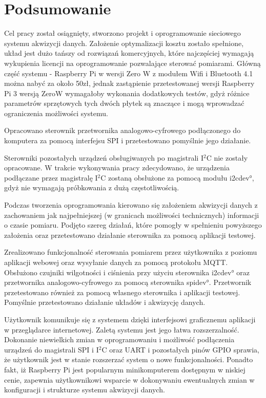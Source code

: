 \chapter{Podsumowanie}
\label{ch:podsumowanie}


Cel pracy został osiągnięty, stworzono projekt i oprogramowanie sieciowego systemu akwizycji danych. Założenie optymalizacji kosztu zostało spełnione, układ jest dużo tańszy od rozwiązań komercyjnych, które najczęściej wymagają wykupienia licencji na oprogramowanie pozwalające sterować pomiarami. Główną część systemu - Raspberry Pi w wersji Zero W z modułem Wifi i Bluetooth 4.1 można nabyć za około 50zł, jednak zastąpienie przetestowanej wersji Raspberry Pi 3 wersją ZeroW wymagałoby wykonania dodatkowych testów, gdyż różnice parametrów sprzętowych tych dwóch płytek są znaczące i mogą wprowadzać ograniczenia możliwości systemu.

Opracowano sterownik przetwornika analogowo-cyfrowego podłączonego do komputera za pomocą interfejsu SPI i przetestowano pomyślnie jego działanie.

Sterowniki pozostałych urządzeń obsługiwanych po magistrali I$^2$C nie zostały opracowane.
W trakcie wykonywania pracy zdecydowano, że urządzenia podłączane przez magistralę I$^2$C zostaną obsłużone za pomocą modułu \ang{i2cdev}, gdyż nie wymagają próbkowania z dużą częstotliwością.
 
Podczas tworzenia oprogramowania kierowano się założeniem akwizycji danych z zachowaniem jak najpełniejszej (w granicach możliwości technicznych) informacji o czasie pomiaru. Podjęto szereg działań, które pomogły w spełnieniu powyższego założenia oraz przetestowano działanie sterownika za pomocą aplikacji testowej. 

 Zrealizowano funkcjonalność sterowania pomiarem przez użytkownika z poziomu aplikacji webowej oraz wysyłanie danych za pomocą protokołu MQTT. Obsłużono czujniki wilgotności i ciśnienia przy użyciu sterownika \ang{i2cdev} oraz przetwornika analogowo-cyfrowego za pomocą sterownika \ang{spidev}. Przetwornik przetestowano również za pomocą własnego sterownika i aplikacji testowej. Pomyślnie przetestowano działanie układów i akwizycję danych. 

Użytkownik komunikuje się z systemem dzięki interfejsowi graficznemu aplikacji w przeglądarce internetowej. Zaletą systemu jest jego łatwa rozszerzalność. Dokonanie niewielkich zmian w oprogramowaniu i możliwość podłączenia urządzeń do magistrali SPI i I$^2$C oraz UART i pozostałych pinów GPIO sprawia, że użytkownik jest w stanie rozszerzać system o nowe funkcjonalności. Ponadto fakt, iż Raspberry Pi jest popularnym minikomputerem dostępnym w niskiej cenie, zapewnia użytkownikowi wsparcie w dokonywaniu ewentualnych zmian w konfiguracji i strukturze systemu akwizycji danych. 

